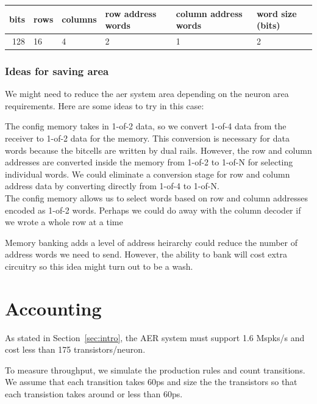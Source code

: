 \documentclass{article}
\begin{document}
\begin{center}
    \begin{tabular}{|r|l|l|l|l|l|}
    \hline
    bits & rows & columns & row address words & column address words & word size (bits) \\ \hline
    128 & 16 & 4 & 2 & 1 & 2 \\ \hline
    \end{tabular}
\end{center}

\subsubsection*{Ideas for saving area}

We might need to reduce the aer system area depending on the neuron area
requirements. Here are some ideas to try in this case:

\noindent
The config memory takes in 1-of-2 data, so we convert 1-of-4 data from the 
receiver to 1-of-2 data for the memory. 
This conversion is necessary for data words because the bitcells 
are written by dual rails.
However, the row and column addresses are converted inside the memory
from 1-of-2 to 1-of-N for selecting individual words. We could
eliminate a conversion stage for row and column address data by converting
directly from 1-of-4 to 1-of-N. \\

\noindent
The config memory allows us to select words based on row and column addresses
encoded as 1-of-2 words. Perhaps we could do away with the column decoder if 
we wrote a whole row at a time

\noindent
Memory banking adds a level of address heirarchy could reduce
the number of address words we need to send. However, the ability to bank
will cost extra circuitry so this idea might turn out to be a wash. \\

\section{Accounting \label{sec:accounting}}

As stated in Section~\ref{sec:intro}, the AER system must support 1.6 Mspks/s 
and cost less than 175 transistors/neuron.

To measure throughput, we simulate the production rules and count transitions.
We assume that each transition takes 60ps and size the the transistors so that
each transistion takes around or less than 60ps.
\end{document}
